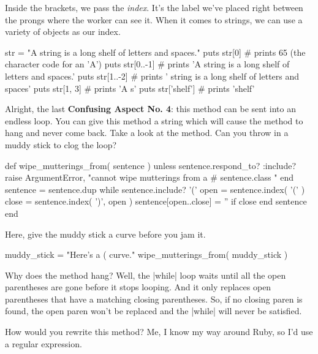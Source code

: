\documentclass[12pt,twoside]{report}
\begin{document}
Inside the brackets, we pass the {\em index}.  It's the label we've
placed right between the prongs where the worker can see it.  When it
comes to strings, we can use a variety of objects as our index.


\begin{rubycode}

 str = "A string is a long shelf of letters and spaces."
 puts str[0]       # prints 65 (the character code for an 'A')
 puts str[0..-1]   # prints 'A string is a long shelf of letters and spaces.'
 puts str[1..-2]   # prints ' string is a long shelf of letters and spaces'
 puts str[1, 3]    # prints 'A s'
 puts str['shelf'] # prints 'shelf'

\end{rubycode}


Alright, the last {\bf Confusing Aspect No. 4}: this method can be
sent into an endless loop. You can give this method a string which
will cause the method to hang and never come back. Take a look at the
method.  Can you throw in a muddy stick to clog the loop?


\begin{rubycode}

 def wipe_mutterings_from( sentence )
   unless sentence.respond_to? :include?
     raise ArgumentError,
       "cannot wipe mutterings from a #{ sentence.class }"
   end
   sentence = sentence.dup
   while sentence.include? '('
     open = sentence.index( '(' )
     close = sentence.index( ')', open )
     sentence[open..close] = '' if close
   end
   sentence
 end

\end{rubycode}


Here, give the muddy stick a curve before you jam it.


\begin{rubycode}

 muddy_stick = "Here's a ( curve."
 wipe_mutterings_from( muddy_stick )

\end{rubycode}


Why does the method hang?  Well, the
\rubyinline|while| loop waits until all the open
parentheses are gone before it stops looping.  And it only replaces
open parentheses that have a matching closing parentheses.  So, if no
closing paren is found, the open paren won't be replaced and the
\rubyinline|while| will never be satisfied.

How would you rewrite this method?  Me, I know my way around Ruby, so
I'd use a regular expression.
\end{document}
